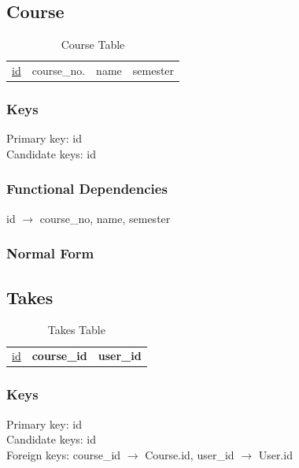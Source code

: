 \documentclass[11pt]{article}
\begin{document}
\subsection{Course}
\label{sec-3-5}


   
\begin{table}[htb]
\caption{Course Table} 
\begin{center}
\begin{tabular}{llll}
 \underline{id}  &  course\_no.  &  name  &  semester  \\
\end{tabular}
\end{center}
\end{table}
\subsubsection{Keys}
\label{sec-3-5-1}

    
    Primary key: id\\
    Candidate keys: id
\subsubsection{Functional Dependencies}
\label{sec-3-5-2}


    id $\rightarrow$ course\_no, name, semester
\subsubsection{Normal Form}
\label{sec-3-5-3}
\subsection{Takes}
\label{sec-3-6}


\begin{table}[htb]
\caption{Takes Table} 
\begin{center}
\begin{tabular}{lll}
 \underline{id}  &  \textbf{course\_id}  &  \textbf{user\_id}  \\
\end{tabular}
\end{center}
\end{table}
\subsubsection{Keys}
\label{sec-3-6-1}

    
    Primary key: id\\    
    Candidate keys: id\\
    Foreign keys: course\_id $\rightarrow$ Course.id, user\_id $\rightarrow$ User.id
\end{document}
